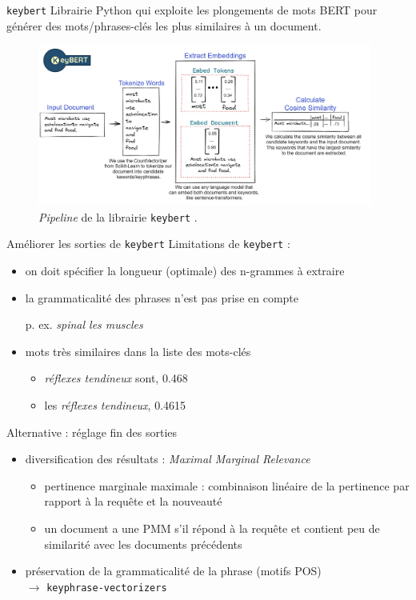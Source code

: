 \begin{frame}{\texttt{keybert}}
Librairie Python qui exploite les plongements de mots BERT pour générer des mots\customhyphen/phrases-clés les plus similaires à un document.
   \begin{figure}[!ht]
        \centering
        \includegraphics[width=110mm,scale=0.5]{pic/keybert.png}
        \caption{\textit{Pipeline} de la librairie \texttt{keybert} \citep{grootendorst2020keybert}.}
        \label{fig:enter-label}
    \end{figure}
\end{frame}
\begin{frame}{Améliorer les sorties de \texttt{keybert}}
Limitations de \texttt{keybert} :
\begin{itemize}
\item on doit spécifier la longueur (optimale) des n-grammes à extraire
\item la grammaticalité des phrases n'est pas prise en compte
\begin{itemize}
p. ex. \textit{spinal les muscles}
\end{itemize}
\item mots très similaires dans la liste des mots-clés 
\begingroup
{}
\begin{itemize}
\item \textit{réflexes tendineux} sont, 0.468
\item les \textit{réflexes tendineux}, 0.4615
\end{itemize}
\endgroup
\end{itemize}

Alternative : réglage fin des sorties
\begin{itemize}
\item diversification des résultats : \textit{Maximal Marginal Relevance}
\begin{itemize}
\item \og{}pertinence marginale maximale\fg{} : combinaison linéaire de la pertinence par rapport à la requête et la nouveauté
\item un document a une PMM s'il répond à la requête et contient peu de similarité avec les documents précédents \citep{boutin2006biais}
\end{itemize}
\item préservation de la grammaticalité de la phrase (motifs POS) \\$\rightarrow$ {\small\texttt{keyphrase-vectorizers}} {\small\citep{schopf22}}
\end{itemize}
\end{frame}

